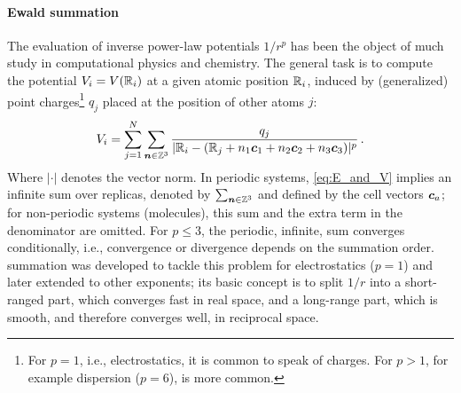\documentclass[10pt]{article} %
\begin{document}
\paragraph{Ewald summation}
\label{sec:apx-ewald_summation}
The evaluation of inverse power-law potentials $1/r^p$ has been the object of much study in computational physics and chemistry. The general task is to compute the potential $V_i = V(\mathbb{R}_i)$ at a given atomic position $\mathbb{R}_i$, induced by (generalized) point charges\footnote{For $p=1$, i.e., electrostatics, it is common to speak of charges. For $p>1$, for example dispersion ($p=6$),  is more common.} $q_j$ placed at the position of other atoms $j$:
\begin{equation}
    V_i = \sum_{j=1}^N \sum_{{\bm{n}} \in \mathbb{Z}^3} \frac{q_j}{|\mathbb{R}_i - (\mathbb{R}_j + n_1 {\bm{c}}_1 + n_2 {\bm{c}}_2 + n_3 {\bm{c}}_3 )|^p}  \,. \label{eq:E_and_V}
\end{equation}
Where $|\cdot|$ denotes the vector norm. In periodic systems, \cref{eq:E_and_V} implies an infinite sum over replicas, denoted by $\sum_{{\bm{n}} \in \mathbb{Z}^3}$ and defined by the cell vectors ${\bm{c}}_a$; for non-periodic systems (molecules), this sum and the extra term in the denominator are omitted. For $p\leq3$, the periodic, infinite, sum converges conditionally, i.e., convergence or divergence depends on the summation order. \citet{e1921} summation was developed to tackle this problem for electrostatics ($p=1$) and later extended to other exponents; its basic concept is to split $1/r$ into a short-ranged part, which converges fast in real space, and a long-range part, which is smooth, and therefore converges well, in reciprocal space.
% 
\end{document}

